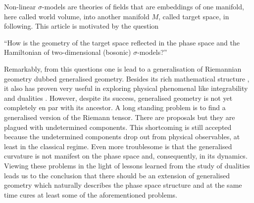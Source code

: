 \documentclass[11pt,a4paper]{article}
\numberwithin{equation}{section}
\begin{document}
Non-linear $\sigma$-models are theories of fields that are embeddings of one manifold, here called world volume, into another manifold $M$, called target space, in following. This article is motivated by the question
\begin{center}
    ``How is the geometry of the target space reflected in the phase space and the Hamiltonian of two-dimensional (bosonic) $\sigma$-models?''
\end{center}
Remarkably, from this questions one is lead to a generalisation of Riemannian geometry dubbed generalised geometry. Besides its rich mathematical structure \cite{Hitchin:2003cxu,Gualtieri:2003dx}, it also has proven very useful in exploring physical phenomenal like integrability \cite{Lust:2018jsx,Demulder:2018lmj,Borsato:2021gma,Borsato:2021vfy} and dualities \cite{Severa:2015hta,Hassler:2017yza,Sakatani:2019jgu,Osten:2019ayq}. However, despite its success, generalised geometry is not yet completely en par with its ancestor. A long standing problem is to find a generalised version of the Riemann tensor. There are proposals \cite{Jeon:2010rw,Coimbra:2011nw,Hohm:2011si} but they are plagued with undetermined components. This shortcoming is still accepted because the undetermined components drop out from physical observables, at least in the classical regime. Even more troublesome is that the generalised curvature is not manifest on the phase space and, consequently, in its dynamics. %
Viewing these problems in the light of lessons learned from the study of dualities leads us to the conclusion that there should be an extension of generalised geometry which naturally describes the phase space structure and at the same time cures at least some of the aforementioned problems.
\end{document}

